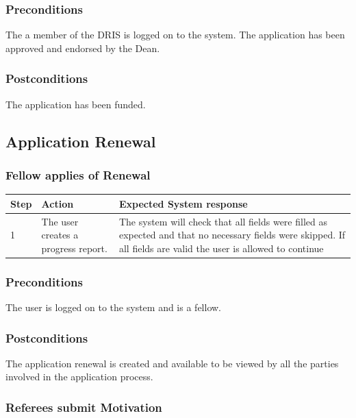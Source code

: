 \documentclass[12pt]{article}
\begin{document}
\subsubsection*{Preconditions}
The a member of the DRIS is logged on to the system. The application has been approved and endorsed by the Dean.

\subsubsection*{Postconditions}
The application has been funded.

\subsection{Application Renewal}

\subsubsection{Fellow applies of Renewal}

\begin{center}
\begin{tabular}{|l|p{6cm}|p{8cm}|}
\hline
Step & Action & Expected System response \\
\hline
1 & The user creates a progress report. & The system will check that all fields were filled as expected and that no necessary fields were skipped. If all fields are valid the user is allowed to continue \\
\hline

\end{tabular}
\end{center}

\subsubsection*{Preconditions}
The user is logged on to the system and is a fellow.

\subsubsection*{Postconditions}
The application renewal is created and available to be viewed by all the parties involved in the application process.

\subsubsection{Referees submit Motivation}
\end{document}
